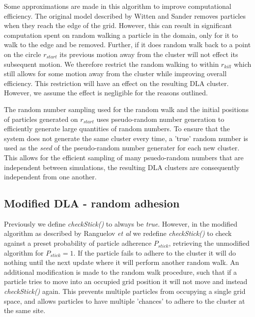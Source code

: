 \documentclass[10pt, twocolumn]{article} %
\begin{document}
  Some approximations are made in this algorithm to improve computational efficiency. The original model described by Witten and Sander \cite{Witten_1981} removes particles when they reach the edge of the grid. However, this can result in significant computation spent on random walking a particle in the domain, only for it to walk to the edge and be removed. Further, if it does random walk back to a point on the circle $r_{start}$ its previous motion away from the cluster will not effect its subsequent motion. We therefore restrict the random walking to within $r_{kill}$ which still allows for some motion away from the cluster while improving overall efficiency. This restriction will have an effect on the resulting DLA cluster. However, we assume the effect is negligible for the reasons outlined.

  The random number sampling used for the random walk and the initial positions of particles generated on $r_{start}$ uses pseudo-random number generation to efficiently generate large quantities of random numbers. To ensure that the system does not generate the same cluster every time, a 'true' random number is used as the \textit{seed} of the pseudo-random number generater for each new cluster. This allows for the efficient sampling of many psuedo-random numbers that are independent between simulations, the resulting DLA clusters are consequently independent from one another.

\subsection*{Modified DLA - random adhesion}
  Previously we define \textit{checkStick()} to always be \textit{true}. However, in the modified algorithm as described by Ranguelov \textit{et al} \cite{Ranguelov_2011} we redefine \textit{checkStick()} to check against a preset probability of particle adherence $P_{stick}$, retrieving the unmodified algorithm for $P_{stick} = 1$. If the particle fails to adhere to the cluster it will do nothing until the next update where it will perform another random walk. An additional modification is made to the random walk procedure, such that if a particle tries to move into an occupied grid position it will not move and instead \textit{checkStick()} again. This prevents multiple particles from occupying a single grid space, and allows particles to have multiple 'chances' to adhere to the cluster at the same site.
\end{document}

